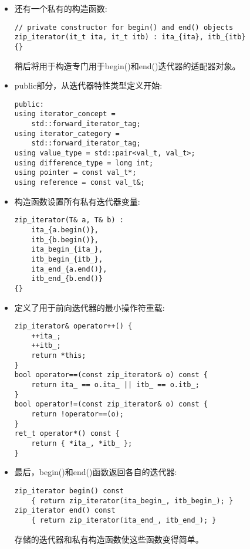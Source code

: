 \begin{itemize}
\item 
还有一个私有的构造函数:

\begin{lstlisting}[style=styleCXX]
// private constructor for begin() and end() objects
zip_iterator(it_t ita, it_t itb) : ita_{ita}, itb_{itb}
{}
\end{lstlisting}

稍后将用于构造专门用于begin()和end()迭代器的适配器对象。

\item 
public部分，从迭代器特性类型定义开始:

\begin{lstlisting}[style=styleCXX]
public:
using iterator_concept =
	std::forward_iterator_tag;
using iterator_category =
	std::forward_iterator_tag;
using value_type = std::pair<val_t, val_t>;
using difference_type = long int;
using pointer = const val_t*;
using reference = const val_t&;
\end{lstlisting}

\item 
构造函数设置所有私有迭代器变量:

\begin{lstlisting}[style=styleCXX]
zip_iterator(T& a, T& b) :
	ita_{a.begin()},
	itb_{b.begin()},
	ita_begin_{ita_},
	itb_begin_{itb_},
	ita_end_{a.end()},
	itb_end_{b.end()}
{}
\end{lstlisting}

\item 
定义了用于前向迭代器的最小操作符重载:

\begin{lstlisting}[style=styleCXX]
zip_iterator& operator++() {
	++ita_;
	++itb_;
	return *this;
}
bool operator==(const zip_iterator& o) const {
	return ita_ == o.ita_ || itb_ == o.itb_;
}
bool operator!=(const zip_iterator& o) const {
	return !operator==(o);
}
ret_t operator*() const {
	return { *ita_, *itb_ };
}
\end{lstlisting}

\item 
最后，begin()和end()函数返回各自的迭代器:

\begin{lstlisting}[style=styleCXX]
zip_iterator begin() const
	{ return zip_iterator(ita_begin_, itb_begin_); }
zip_iterator end() const
	{ return zip_iterator(ita_end_, itb_end_); }
\end{lstlisting}

存储的迭代器和私有构造函数使这些函数变得简单。


\end{itemize}
